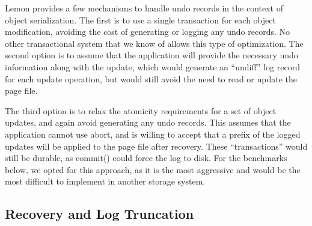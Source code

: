 \documentclass[letterpaper,twocolumn,english]{article}
\newcommand{\yad}{Lemon\xspace}
\begin{document}
\yad provides a few mechanisms to handle undo records in the context
of object serialization. The first is to use a single transaction for
each object modification, avoiding the cost of generating or logging
any undo records. No other transactional system that we know of allows
this type of optimization. The second option is to assume that the
application will provide the necessary undo information along with the
update, which would generate an ``undiff'' log record for each update
operation, but would still avoid the need to read or update the page
file.

The third option is to relax the atomicity requirements for a set of
object updates, and again avoid generating any undo records. This
assumes that the application cannot use abort, and is willing to
accept that a prefix of the logged updates will be applied to the page
file after recovery. These ``transactions'' would still be durable, as
commit() could force the log to disk. For the benchmarks below, we
opted for this approach, as it is the most aggressive and would be the
most difficult to implement in another storage system.

\subsection{Recovery and Log Truncation}
\end{document}
